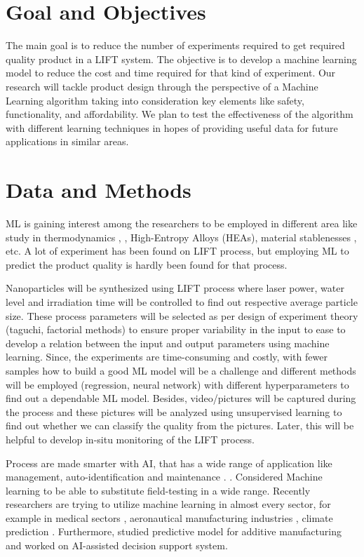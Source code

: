 \documentclass[letterpaper]{article}
\begin{document}
\section*{Goal and Objectives}
The main goal is to reduce the number of experiments required to get required quality product in a LIFT system. The objective is to develop a machine learning model to reduce the cost and time required for that kind of experiment. Our research will tackle product design through the perspective of a Machine Learning algorithm taking into consideration key elements like safety, functionality, and affordability. We plan to test the effectiveness of the algorithm with different learning techniques in hopes of providing useful data for future applications in similar areas.

\section*{Data and Methods}
ML is gaining interest among the researchers to be employed in different area like study in thermodynamics \parencite[]{ding}, \parencite[]{thermal},  High-Entropy Alloys (HEAs)\parencite[]{qiao}, material stablenesses \parencite[]{he}, etc. A lot of experiment has been found on LIFT process, but employing ML to predict the product quality is hardly been found for that process.\par
Nanoparticles will be synthesized using LIFT process where laser power, water level and irradiation time will be controlled to find out respective average particle size. These process parameters will be selected as per design of experiment theory (taguchi, factorial methods) to ensure proper variability in the input to ease to develop a relation between the input and output parameters using machine learning. Since, the experiments are time-consuming and costly, with fewer samples how to build a good ML model will be a challenge and different methods will be employed (regression, neural network) with different hyperparameters to find out a dependable ML model. Besides, video/pictures will be captured during the process and these pictures will be analyzed using unsupervised learning to find out whether we can classify the quality from the pictures. Later, this will be helpful to develop in-situ monitoring of the LIFT process.\par
Process are made smarter with AI, that has a wide range of application like management, auto-identification and maintenance \parencite[]{xu}. \parencite[]{bourhis}. Considered Machine learning to be able to substitute field-testing in a wide range. Recently researchers are trying to utilize machine learning in almost every sector, for example in medical sectors \parencite[]{twin}, aeronautical manufacturing industries \parencite[]{zohdi}, climate prediction \parencite[]{koc}.  Furthermore, \parencite[]{tapia}  studied predictive model for additive manufacturing and \parencite[]{kharchenko} worked on AI-assisted decision support system.
\end{document}
